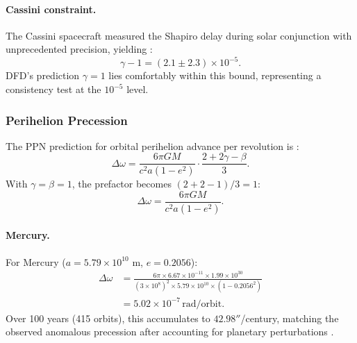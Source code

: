 \paragraph{Cassini constraint.}
The Cassini spacecraft measured the Shapiro delay during solar conjunction with unprecedented precision, yielding \cite{Bertotti2003}:
\begin{equation}
\gamma - 1 = (2.1 \pm 2.3) \times 10^{-5}.
\end{equation}
DFD's prediction $\gamma = 1$ lies comfortably within this bound, representing a consistency test at the $10^{-5}$ level.

\subsubsection{Perihelion Precession}\label{sec:ppn-perihelion}

The PPN prediction for orbital perihelion advance per revolution is \cite{Will2014}:
\begin{equation}\label{eq:perihelion}
\Delta\omega = \frac{6\pi GM}{c^2 a(1-e^2)} \cdot \frac{2 + 2\gamma - \beta}{3}.
\end{equation}
With $\gamma = \beta = 1$, the prefactor becomes $(2 + 2 - 1)/3 = 1$:
\begin{equation}
\Delta\omega = \frac{6\pi GM}{c^2 a(1-e^2)}.
\end{equation}

\paragraph{Mercury.}
For Mercury ($a = 5.79 \times 10^{10}$ m, $e = 0.2056$):
\begin{equation}
\begin{split}
\Delta\omega &= \frac{6\pi \times 6.67 \times 10^{-11} \times 1.99 \times 10^{30}}{(3 \times 10^8)^2 \times 5.79 \times 10^{10} \times (1 - 0.2056^2)} \\
&= 5.02 \times 10^{-7}\,\text{rad/orbit}.
\end{split}
\end{equation}
Over 100 years (415 orbits), this accumulates to $42.98''$/century, matching the observed anomalous precession after accounting for planetary perturbations \cite{Will2014}.

